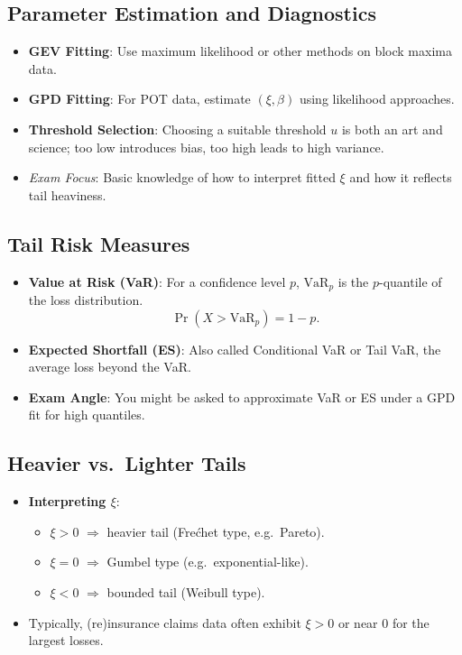\documentclass[13pt,a4paper]{article}
\begin{document}
\subsection{Parameter Estimation and Diagnostics}
\begin{itemize}
  \item \textbf{GEV Fitting}: Use maximum likelihood or other methods on block maxima data.
  \item \textbf{GPD Fitting}: For POT data, estimate \((\xi,\beta)\) using likelihood approaches. 
  \item \textbf{Threshold Selection}: Choosing a suitable threshold \(u\) is both an art and science; too low introduces bias, too high leads to high variance. 
  \item \emph{Exam Focus}: Basic knowledge of how to interpret fitted \(\xi\) and how it reflects tail heaviness.
\end{itemize}

\subsection{Tail Risk Measures}
\begin{itemize}
  \item \textbf{Value at Risk (VaR)}: For a confidence level \(p\), \(\text{VaR}_p\) is the \(p\)-quantile of the loss distribution.
    \[
      \Pr(X > \mathrm{VaR}_p) = 1-p.
    \]
  \item \textbf{Expected Shortfall (ES)}: Also called Conditional VaR or Tail VaR, the average loss beyond the VaR. 
  \item \textbf{Exam Angle}: You might be asked to approximate VaR or ES under a GPD fit for high quantiles.
\end{itemize}

\subsection{Heavier vs.\ Lighter Tails}
\begin{itemize}
  \item \textbf{Interpreting \(\xi\)}:
    \begin{itemize}
      \item \(\xi>0\) \(\Rightarrow\) heavier tail (Fre\'chet type, e.g.\ Pareto).
      \item \(\xi=0\) \(\Rightarrow\) Gumbel type (e.g.\ exponential-like).
      \item \(\xi<0\) \(\Rightarrow\) bounded tail (Weibull type).
    \end{itemize}
  \item Typically, (re)insurance claims data often exhibit \(\xi>0\) or near 0 for the largest losses.
\end{itemize}
\end{document}
